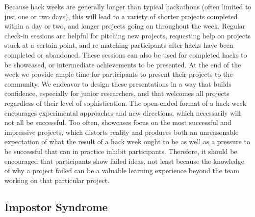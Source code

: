 \documentclass{nature}
\begin{document}
Because hack weeks are generally longer than typical hackathons (often limited to just one or two days), this will lead to a variety of shorter projects completed within a day or two, and longer projects going on throughout the week. Regular check-in sessions are helpful for pitching new projects, requesting help on projects stuck at a certain point, and re-matching participants after hacks have been completed or abandoned. These sessions can also be used for completed hacks to be showcased, or intermediate achievements to be presented. At the end of the week we provide ample time for participants to present their projects to the community. We endeavor to design these presentations in a way that builds confidence, especially for junior researchers, and that welcomes all projects regardless of their level of sophistication. The open-ended format of a hack week encourages experimental approaches and new directions, which necessarily will not all be successful. Too often, showcases focus on the most successful and impressive projects, which distorts reality and produces both an unreasonable expectation of what the result of a hack week ought to be as well as a pressure to be successful that can in practice inhibit participants. Therefore, it should be encouraged that participants show failed ideas, not least because the knowledge of why a project failed can be a valuable learning experience beyond the team working on that particular project.

\subsection{Impostor Syndrome}
\end{document}
